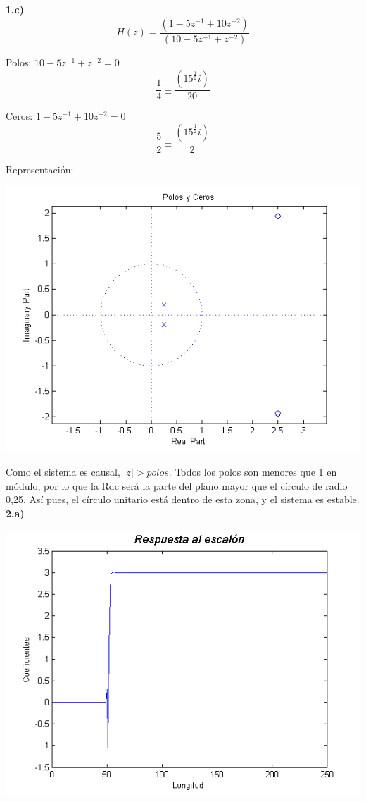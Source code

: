 \documentclass[a4paper,12pt]{article}
\begin{document}
\textbf{1.c)} \\

$$ H(z) = \frac{(1 - 5 z^{-1} + 10 z^{-2})}{(10 - 5 z^{-1} + z^{-2})}$$

Polos: $ 10 - 5 z^{-1} + z^{-2} = 0 $ \\
$$ \frac{1}{4} \pm \frac{(15^{\frac{1}{2}} i)}{20}$$

Ceros: $ 1 - 5 z^{-1} + 10 z^{-2} = 0 $ \\
$$ \frac{5}{2} \pm \frac{(15^{\frac{1}{2}} i)}{2}$$



Representación: \\

\begin{center}
\includegraphics[width=.8 \textwidth]{ejercicio-4-4-b-polos.png}
\end{center}

Como el sistema es causal, $|z| > polos$. Todos los polos son menores que 1 en módulo, por lo que la Rdc será la parte del plano mayor que el círculo de radio 0,25. Así pues, el círculo unitario está dentro de esta zona, y el sistema es estable. \\



\textbf{2.a)} \\

\begin{center}
\includegraphics[width=.8 \textwidth]{ejercicio-4-5-a.png}
\end{center}
\end{document}
